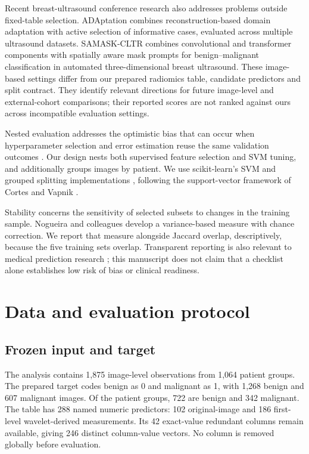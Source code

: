 \documentclass[11pt,a4paper]{article}
\begin{document}
Recent breast-ultrasound conference research also addresses problems outside fixed-table selection. ADAptation \cite{adaptation} combines reconstruction-based domain adaptation with active selection of informative cases, evaluated across multiple ultrasound datasets. SAMASK-CLTR \cite{samask} combines convolutional and transformer components with spatially aware mask prompts for benign--malignant classification in automated three-dimensional breast ultrasound. These image-based settings differ from our prepared radiomics table, candidate predictors and split contract. They identify relevant directions for future image-level and external-cohort comparisons; their reported scores are not ranked against ours across incompatible evaluation settings.

Nested evaluation addresses the optimistic bias that can occur when hyperparameter selection and error estimation reuse the same validation outcomes \cite{varma}. Our design nests both supervised feature selection and SVM tuning, and additionally groups images by patient. We use scikit-learn's SVM and grouped splitting implementations \cite{sklearn}, following the support-vector framework of Cortes and Vapnik \cite{svm}.

Stability concerns the sensitivity of selected subsets to changes in the training sample. Nogueira and colleagues \cite{nogueira} develop a variance-based measure with chance correction. We report that measure alongside Jaccard overlap, descriptively, because the five training sets overlap. Transparent reporting is also relevant to medical prediction research \cite{tripod}; this manuscript does not claim that a checklist alone establishes low risk of bias or clinical readiness.

\section{Data and evaluation protocol}
\subsection{Frozen input and target}
The analysis contains 1,875 image-level observations from 1,064 patient groups. The prepared target codes benign as 0 and malignant as 1, with 1,268 benign and 607 malignant images. Of the patient groups, 722 are benign and 342 malignant. The table has 288 named numeric predictors: 102 original-image and 186 first-level wavelet-derived measurements. Its 42 exact-value redundant columns remain available, giving 246 distinct column-value vectors. No column is removed globally before evaluation.
\end{document}
